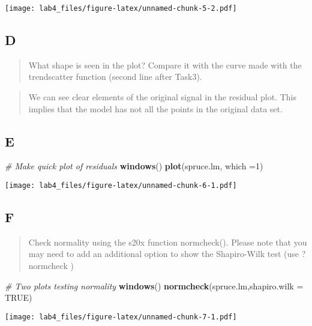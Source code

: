 \documentclass[]{article}
\newenvironment{Shaded}{\begin{snugshade}}{\end{snugshade}}
\newcommand{\KeywordTok}[1]{\textcolor[rgb]{0.13,0.29,0.53}{\textbf{#1}}}
\newcommand{\DataTypeTok}[1]{\textcolor[rgb]{0.13,0.29,0.53}{#1}}
\newcommand{\DecValTok}[1]{\textcolor[rgb]{0.00,0.00,0.81}{#1}}
\newcommand{\CommentTok}[1]{\textcolor[rgb]{0.56,0.35,0.01}{\textit{#1}}}
\newcommand{\OtherTok}[1]{\textcolor[rgb]{0.56,0.35,0.01}{#1}}
\newcommand{\NormalTok}[1]{#1}
\begin{document}
\texttt{[image: lab4\_files/figure-latex/unnamed-chunk-5-2.pdf]}

\subsection{D}\label{d}

\begin{quote}
What shape is seen in the plot? Compare it with the curve made with the
trendscatter function (second line after Task3).
\end{quote}

\begin{quote}
We can see clear elements of the original signal in the residual plot.
This implies that the model has not all the points in the original data
set.
\end{quote}

\subsection{E}\label{e}

\begin{Shaded}
\begin{Highlighting}[]
\CommentTok{# Make quick plot of residuals}
\KeywordTok{windows}\NormalTok{()}
\KeywordTok{plot}\NormalTok{(spruce.lm, }\DataTypeTok{which =}\DecValTok{1}\NormalTok{)}
\end{Highlighting}
\end{Shaded}

\texttt{[image: lab4\_files/figure-latex/unnamed-chunk-6-1.pdf]}

\subsection{F}\label{f}

\begin{quote}
Check normality using the s20x function normcheck(). Please note that
you may need to add an additional option to show the Shapiro-Wilk test
(use ?normcheck )
\end{quote}

\begin{Shaded}
\begin{Highlighting}[]
\CommentTok{# Two plots testing normality}
\KeywordTok{windows}\NormalTok{()}
\KeywordTok{normcheck}\NormalTok{(spruce.lm,}\DataTypeTok{shapiro.wilk =} \OtherTok{TRUE}\NormalTok{)}
\end{Highlighting}
\end{Shaded}

\texttt{[image: lab4\_files/figure-latex/unnamed-chunk-7-1.pdf]}
\end{document}
